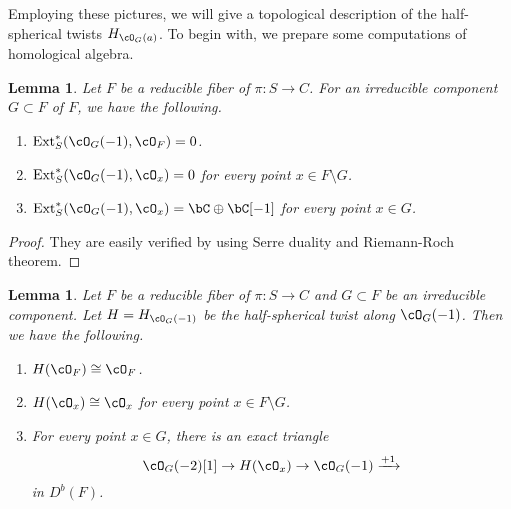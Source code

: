 \documentclass[12pt]{amsart}
\numberwithin{equation}{section}
\theoremstyle{plain}
\newtheorem{lemma}[theorem]{Lemma}
\theoremstyle{definition}
\DeclareMathOperator{\Ext}{\mathrm{Ext}}
\begin{document}
Employing these pictures, we will give a topological description of the half-spherical twists $H_{\cO_G(a)}$.
To begin with, we prepare some computations of homological algebra.
\begin{lemma}
    Let $F$ be a reducible fiber of $\pi \colon S \to C$.
    For an irreducible component $G \subset F$ of $F$, we have the following.
    \begin{enumerate}
        \item $\Ext^*_S(\cO_G(-1), \cO_F) = 0$.
        \item $\Ext^*_S(\cO_G(-1), \cO_x) = 0$ for every point $x \in F \setminus G$.
        \item $\Ext^*_S(\cO_G(-1), \cO_x) = \bC\oplus\bC[-1]$ for every point $x \in G$.
    \end{enumerate}
\end{lemma}
\begin{proof}
    They are easily verified by using Serre duality and Riemann-Roch theorem.
\end{proof}
\begin{lemma}\label{lem:preparation}
    Let $F$ be a reducible fiber of $\pi \colon S \to C$ and $G \subset F$ be an irreducible component.
    Let $H = H_{\cO_G(-1)}$ be the half-spherical twist along $\cO_G(-1)$.
    Then we have the following.
    \begin{enumerate}
        \item $H(\cO_F) \cong \cO_F$.
        \item $H(\cO_x) \cong \cO_x$ for every point $x \in F \setminus G$.
        \item For every point $x \in G$, there is an exact triangle  \begin{equation}
                  \cO_G(-2)[1]\to H(\cO_x)\to \cO_G(-1) \xrightarrow{+1}
              \end{equation}
              in $D^b(F)$.
    \end{enumerate}
\end{lemma}
\end{document}
